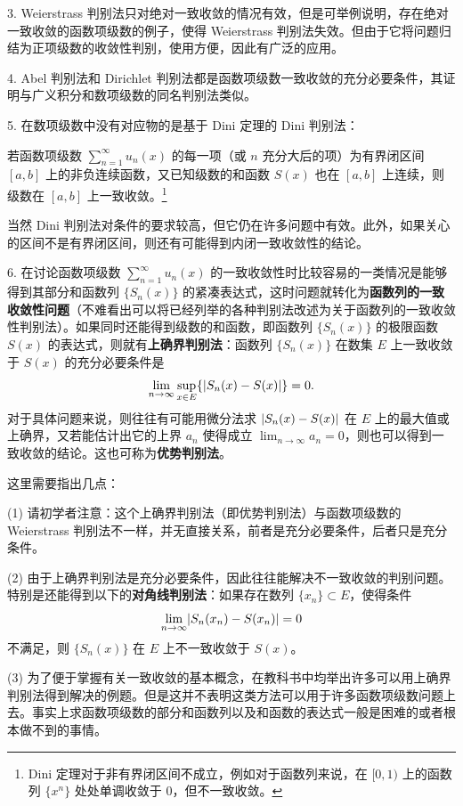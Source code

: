 3. Weierstrass 判别法只对绝对一致收敛的情况有效，但是可举例说明，存在绝对一致收敛的函数项级数的例子，使得 Weierstrass 判别法失效。但由于它将问题归结为正项级数的收敛性判别，使用方便，因此有广泛的应用。

4. Abel 判别法和 Dirichlet 判别法都是函数项级数一致收敛的充分必要条件，其证明与广义积分和数项级数的同名判别法类似。

5. 在数项级数中没有对应物的是基于 Dini 定理的 Dini 判别法：

\begin{xtheorem}[Dini 定理]
若函数项级数 $\displaystyle\sum_{n=1}^{\infty}u_n(x)$ 的每一项（或 $n$ 充分大后的项）为有界闭区间 $[a,b]$ 上的非负连续函数，又已知级数的和函数 $S(x)$ 也在 $[a,b]$ 上连续，则级数在 $[a,b]$ 上一致收敛。\footnote{Dini 定理对于非有界闭区间不成立，例如对于函数列来说，在 $[0,1)$ 上的函数列 $\{x^n\}$ 处处单调收敛于 $0$，但不一致收敛。}
\end{xtheorem}

当然 Dini 判别法对条件的要求较高，但它仍在许多问题中有效。此外，如果关心的区间不是有界闭区间，则还有可能得到内闭一致收敛性的结论。

6. 在讨论函数项级数 $\displaystyle\sum_{n=1}^{\infty}u_n(x)$ 的一致收敛性时比较容易的一类情况是能够得到其部分和函数列 $\{S_n(x)\}$ 的紧凑表达式，这时问题就转化为\textbf{函数列的一致收敛性问题}（不难看出可以将已经列举的各种判别法改述为关于函数列的一致收敛性判别法）。如果同时还能得到级数的和函数，即函数列 $\{S_n(x)\}$ 的极限函数 $S(x)$ 的表达式，则就有\textbf{上确界判别法}：函数列 $\{S_n(x)\}$ 在数集 $E$ 上一致收敛于 $S(x)$ 的充分必要条件是
\[
  \lim_{n\to\infty}\sup_{x\in E}\{\lvert S_n(x)-S(x)\rvert\}=0.
\]
对于具体问题来说，则往往有可能用微分法求 $\lvert S_n(x)-S(x)\rvert$ 在 $E$ 上的最大值或上确界，又若能估计出它的上界 $a_n$ 使得成立 $\displaystyle\lim_{n\to\infty}a_n=0$，则也可以得到一致收敛的结论。这也可称为\textbf{优势判别法}。

这里需要指出几点：

(1) 请初学者注意：这个上确界判别法（即优势判别法）与函数项级数的 Weierstrass 判别法不一样，并无直接关系，前者是充分必要条件，后者只是充分条件。

(2) 由于上确界判别法是充分必要条件，因此往往能解决不一致收敛的判别问题。特别是还能得到以下的\textbf{对角线判别法}：如果存在数列 $\{x_n\}\subset E$，使得条件
\[
  \lim_{n\to\infty}\lvert S_n(x_n)-S(x_n)\rvert=0
\]
不满足，则 $\{S_n(x)\}$ 在 $E$ 上不一致收敛于 $S(x)$。

(3) 为了便于掌握有关一致收敛的基本概念，在教科书中均举出许多可以用上确界判别法得到解决的例题。但是这并不表明这类方法可以用于许多函数项级数问题上去。事实上求函数项级数的部分和函数列以及和函数的表达式一般是困难的或者根本做不到的事情。

